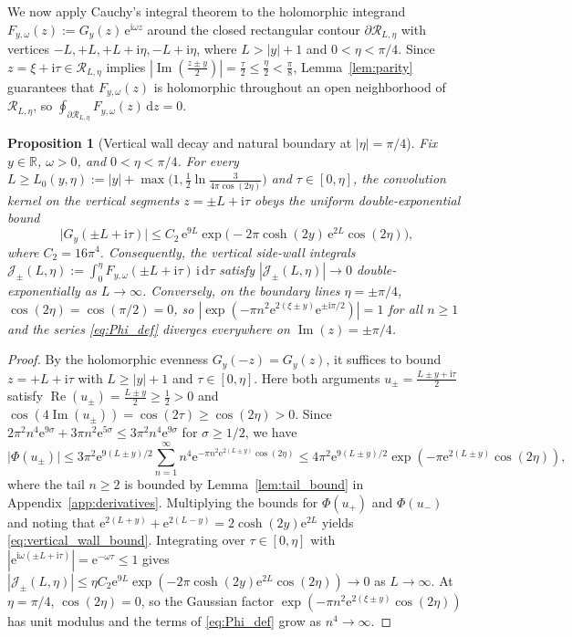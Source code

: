 \documentclass[11pt,a4paper,reqno]{amsart}
\newtheorem{proposition}[theorem]{Proposition}
\theoremstyle{definition}
\theoremstyle{remark}
\numberwithin{equation}{section}
\newcommand{\dd}{\mathrm{d}}
\newcommand{\ii}{\mathrm{i}}
\newcommand{\ee}{\mathrm{e}}
\newcommand{\Rea}{\operatorname{Re}}
\newcommand{\Ima}{\operatorname{Im}}
\begin{document}
We now apply Cauchy's integral theorem to the holomorphic integrand $F_{y,\omega}(z) := G_y(z)\,\ee^{\ii\omega z}$ around the closed rectangular contour $\partial\mathcal{R}_{L,\eta}$ with vertices $-L, +L, +L+\ii\eta, -L+\ii\eta$, where $L > |y| + 1$ and $0 < \eta < \pi/4$. Since $z = \xi + \ii\tau \in \mathcal{R}_{L,\eta}$ implies $|\Ima(\frac{z\pm y}{2})| = \frac{\tau}{2} \le \frac{\eta}{2} < \frac{\pi}{8}$, Lemma~\ref{lem:parity} guarantees that $F_{y,\omega}(z)$ is holomorphic throughout an open neighborhood of $\mathcal{R}_{L,\eta}$, so $\oint_{\partial\mathcal{R}_{L,\eta}} F_{y,\omega}(z)\,\dd z = 0$.

\begin{proposition}[Vertical wall decay and natural boundary at $|\eta| = \pi/4$]\label{prop:wall_decay}
Fix $y \in \mathbb{R}$, $\omega > 0$, and $0 < \eta < \pi/4$. For every $L \ge L_0(y,\eta) := |y| + \max\!\big(1, \frac{1}{2}\ln\frac{3}{4\pi\cos(2\eta)}\big)$ and $\tau \in [0,\eta]$, the convolution kernel on the vertical segments $z = \pm L + \ii\tau$ obeys the uniform double-exponential bound
\begin{equation}\label{eq:vertical_wall_bound}
\big|G_y(\pm L + \ii\tau)\big| \le C_2\,\ee^{9L}\exp\!\Big(-2\pi\cosh(2y)\,\ee^{2L}\cos(2\eta)\Big),
\end{equation}
where $C_2 = 16\pi^4$. Consequently, the vertical side-wall integrals $\mathcal{J}_{\pm}(L,\eta) := \int_0^\eta F_{y,\omega}(\pm L + \ii\tau)\,\ii\,\dd\tau$ satisfy $|\mathcal{J}_{\pm}(L,\eta)| \to 0$ double-exponentially as $L \to \infty$. Conversely, on the boundary lines $\eta = \pm\pi/4$, $\cos(2\eta) = \cos(\pi/2) = 0$, so $|\exp(-\pi n^2\ee^{2(\xi\pm y)}\ee^{\pm\ii\pi/2})| = 1$ for all $n \ge 1$ and the series \eqref{eq:Phi_def} diverges everywhere on $\Ima(z) = \pm\pi/4$.
\end{proposition}

\begin{proof}
By the holomorphic evenness $G_y(-z) = G_y(z)$, it suffices to bound $z = +L + \ii\tau$ with $L \ge |y| + 1$ and $\tau \in [0,\eta]$. Here both arguments $u_\pm = \frac{L \pm y + \ii\tau}{2}$ satisfy $\Rea(u_\pm) = \frac{L\pm y}{2} \ge \frac{1}{2} > 0$ and $\cos(4\Ima(u_\pm)) = \cos(2\tau) \ge \cos(2\eta) > 0$. Since $2\pi^2 n^4\ee^{9\sigma} + 3\pi n^2\ee^{5\sigma} \le 3\pi^2 n^4\ee^{9\sigma}$ for $\sigma \ge 1/2$, we have
\[
\big|\Phi(u_\pm)\big| \le 3\pi^2\ee^{9(L\pm y)/2}\sum_{n=1}^\infty n^4\ee^{-\pi n^2\ee^{2(L\pm y)}\cos(2\eta)} \le 4\pi^2\ee^{9(L\pm y)/2}\exp\!\left(-\pi\ee^{2(L\pm y)}\cos(2\eta)\right),
\]
where the tail $n \ge 2$ is bounded by Lemma~\ref{lem:tail_bound} in Appendix~\ref{app:derivatives}. Multiplying the bounds for $\Phi(u_+)$ and $\Phi(u_-)$ and noting that $\ee^{2(L+y)} + \ee^{2(L-y)} = 2\cosh(2y)\ee^{2L}$ yields \eqref{eq:vertical_wall_bound}. Integrating over $\tau \in [0,\eta]$ with $|\ee^{\ii\omega(\pm L + \ii\tau)}| = \ee^{-\omega\tau} \le 1$ gives $|\mathcal{J}_{\pm}(L,\eta)| \le \eta C_2\ee^{9L}\exp(-2\pi\cosh(2y)\ee^{2L}\cos(2\eta)) \to 0$ as $L \to \infty$. At $\eta = \pi/4$, $\cos(2\eta) = 0$, so the Gaussian factor $\exp(-\pi n^2 \ee^{2(\xi\pm y)}\cos(2\eta))$ has unit modulus and the terms of \eqref{eq:Phi_def} grow as $n^4 \to \infty$.
\end{proof}
\end{document}
